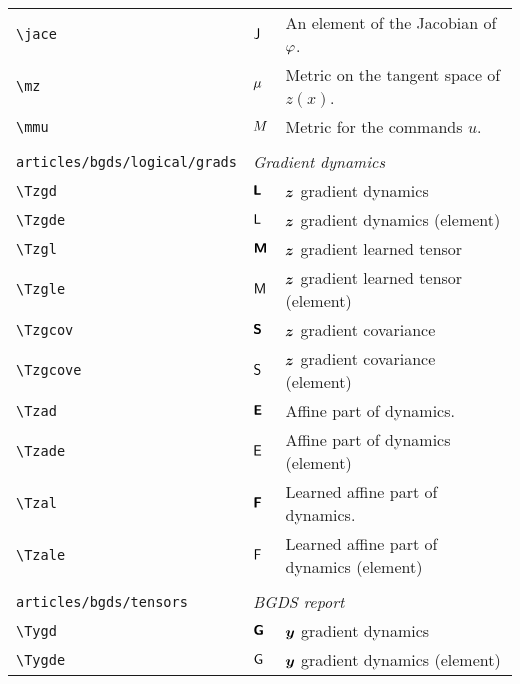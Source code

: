 \begin{longtable}{lll}
 {\color[rgb]{0.5,0.5,0.5}\texttt{\textbackslash jace}} & ${\mathsf{J}}$ &  An element of the Jacobian of $\varphi$.\\ 
 {\color[rgb]{0.5,0.5,0.5}\texttt{\textbackslash mz}} & $\mu$ &  Metric on the tangent space of $z(x)$.\\ 
 {\color[rgb]{0.5,0.5,0.5}\texttt{\textbackslash mmu}} & $M$ &  Metric for the commands $u$. \\ 
  &  & \\ 
 {\color[rgb]{0.5,0.5,0.5}\texttt{articles/bgds/logical/grads}} & \multicolumn{2}{l}{\emph{Gradient dynamics}}\\ 
 \hline
{\color[rgb]{0.5,0.5,0.5}\texttt{\textbackslash Tzgd}} & $\boldsymbol{{\mathsf{L}}}$ &  $\boldsymbol{z}$  gradient dynamics\\ 
 {\color[rgb]{0.5,0.5,0.5}\texttt{\textbackslash Tzgde}} & ${\mathsf{L}}$ &  $\boldsymbol{z}$  gradient dynamics (element)\\ 
 {\color[rgb]{0.5,0.5,0.5}\texttt{\textbackslash Tzgl}} & $\boldsymbol{{\mathsf{M}}}$ &  $\boldsymbol{z}$  gradient  learned tensor \\ 
 {\color[rgb]{0.5,0.5,0.5}\texttt{\textbackslash Tzgle}} & ${\mathsf{M}}$ &  $\boldsymbol{z}$  gradient  learned tensor (element)\\ 
 {\color[rgb]{0.5,0.5,0.5}\texttt{\textbackslash Tzgcov}} & $\boldsymbol{{\mathsf{S}}}$ &  $\boldsymbol{z}$  gradient  covariance\\ 
 {\color[rgb]{0.5,0.5,0.5}\texttt{\textbackslash Tzgcove}} & ${\mathsf{S}}$ &  $\boldsymbol{z}$  gradient  covariance (element)\\ 
 {\color[rgb]{0.5,0.5,0.5}\texttt{\textbackslash Tzad}} & $\boldsymbol{{\mathsf{E}}}$ &  Affine part of dynamics.\\ 
 {\color[rgb]{0.5,0.5,0.5}\texttt{\textbackslash Tzade}} & ${\mathsf{E}}$ &  Affine part of dynamics (element)\\ 
 {\color[rgb]{0.5,0.5,0.5}\texttt{\textbackslash Tzal}} & $\boldsymbol{{\mathsf{F}}}$ &  Learned affine part of dynamics.\\ 
 {\color[rgb]{0.5,0.5,0.5}\texttt{\textbackslash Tzale}} & ${\mathsf{F}}$ &  Learned affine part of dynamics (element)\\ 
  &  & \\ 
 {\color[rgb]{0.5,0.5,0.5}\texttt{articles/bgds/tensors}} & \multicolumn{2}{l}{\emph{BGDS report}}\\ 
 \hline
{\color[rgb]{0.5,0.5,0.5}\texttt{\textbackslash Tygd}} & $\boldsymbol{{\mathsf{G}}}$ &  $\boldsymbol{y}$ gradient dynamics\\ 
 {\color[rgb]{0.5,0.5,0.5}\texttt{\textbackslash Tygde}} & ${\mathsf{G}}$ &  $\boldsymbol{y}$ gradient dynamics (element)\\ 

\end{longtable}
